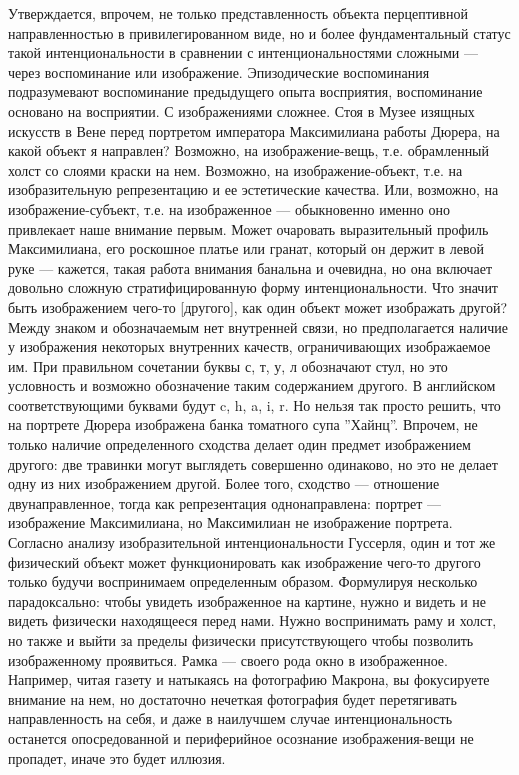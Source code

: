 \documentclass[11pt]{book}
\begin{document}
Утверждается, впрочем, не только представленность объекта перцептивной направленностью в привилегированном виде, но и более фундаментальный статус такой интенциональности в сравнении с интенциональностями сложными --- через воспоминание или изображение. Эпизодические воспоминания подразумевают воспоминание предыдущего опыта восприятия, воспоминание основано на восприятии. С изображениями сложнее. Стоя в Музее изящных искусств в Вене перед портретом императора Максимилиана работы Дюрера, на какой объект я направлен? Возможно, на изображение-вещь, т.е. обрамленный холст со слоями краски на нем. Возможно, на изображение-объект, т.е. на изобразительную репрезентацию и ее эстетические качества. Или, возможно, на изображение-субъект, т.е. на изображенное --- обыкновенно именно оно привлекает наше внимание первым. Может очаровать выразительный профиль Максимилиана, его роскошное платье или гранат, который он держит в левой руке --- кажется, такая работа внимания банальна и очевидна, но она включает довольно сложную стратифицированную форму интенциональности. Что значит быть изображением чего-то [другого], как один объект может изображать другой? Между знаком и обозначаемым нет внутренней связи, но предполагается наличие у изображения некоторых внутренних качеств, ограничивающих изображаемое им. При правильном сочетании буквы с, т, у, л обозначают стул, но это условность и возможно обозначение таким содержанием другого. В английском соответствующими буквами будут c, h, a, i, r. Но нельзя так просто решить, что на портрете Дюрера изображена банка томатного супа ''Хайнц''. Впрочем, не только наличие определенного сходства делает один предмет изображением другого: две травинки могут выглядеть совершенно одинаково, но это не делает одну из них изображением другой. Более того, сходство --- отношение двунаправленное, тогда как репрезентация однонаправлена: портрет --- изображение Максимилиана, но Максимилиан не изображение портрета. Согласно анализу изобразительной интенциональности Гуссерля, один и тот же физический объект может функционировать как изображение чего-то другого только будучи воспринимаем определенным образом. Формулируя несколько парадоксально: чтобы увидеть изображенное на картине, нужно и видеть и не видеть физически находящееся перед нами. Нужно воспринимать раму и холст, но также и выйти за пределы физически присутствующего чтобы позволить изображенному проявиться. Рамка --- своего рода окно в изображенное. Например, читая газету и натыкаясь на фотографию Макрона, вы фокусируете внимание на нем, но достаточно нечеткая фотография будет перетягивать направленность на себя, и даже в наилучшем случае интенциональность останется опосредованной и периферийное осознание изображения-вещи не пропадет, иначе это будет иллюзия.
\end{document}
